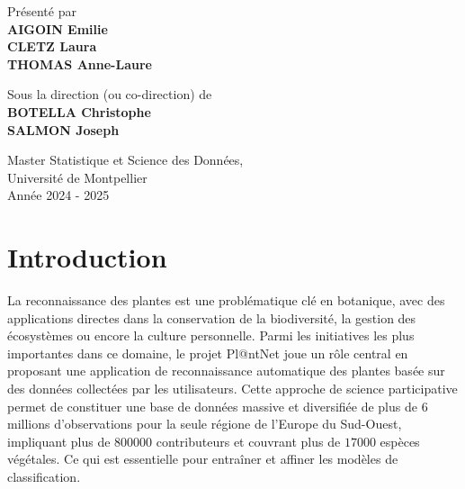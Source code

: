 \documentclass[a4paper,12pt]{article}
\begin{document}
\vfill
\begin{center}
Présenté par \\ \vspace{0.2cm}
    {\textbf{AIGOIN Emilie \\ \vspace{0.1cm} CLETZ Laura \\ \vspace{0.1cm} THOMAS Anne-Laure}}\\ \vspace{0.6cm}
    
Sous la direction (ou co-direction) de \\ \vspace{0.2cm}
    {\textbf{BOTELLA Christophe \\ \vspace{0.1cm} SALMON Joseph }}\\ \vspace{1.5cm}
    
    {\large Master Statistique et Science des Données, \\ \vspace{0.1cm} Université de Montpellier}\\ \vspace{0.6cm}
    {\large Année 2024 - 2025}
\end{center}

\thispagestyle{empty}

\newpage

\tableofcontents 

\newpage


\section{Introduction}

La reconnaissance des plantes est une problématique clé en botanique, avec des applications directes dans la conservation de la biodiversité, la gestion des écosystèmes ou encore la culture personnelle. Parmi les initiatives les plus importantes dans ce domaine, le projet Pl@ntNet joue un rôle central en proposant une application de reconnaissance automatique des plantes basée sur des données collectées par les utilisateurs. Cette approche de science participative permet de constituer une base de données massive et diversifiée de plus de $6$ millions d'observations pour la seule régione de l'Europe du Sud-Ouest, impliquant plus de $\num{800000}$ contributeurs et couvrant plus de $\num{17000}$ espèces végétales. Ce qui est essentielle pour entraîner et affiner les modèles de classification.
\end{document}
